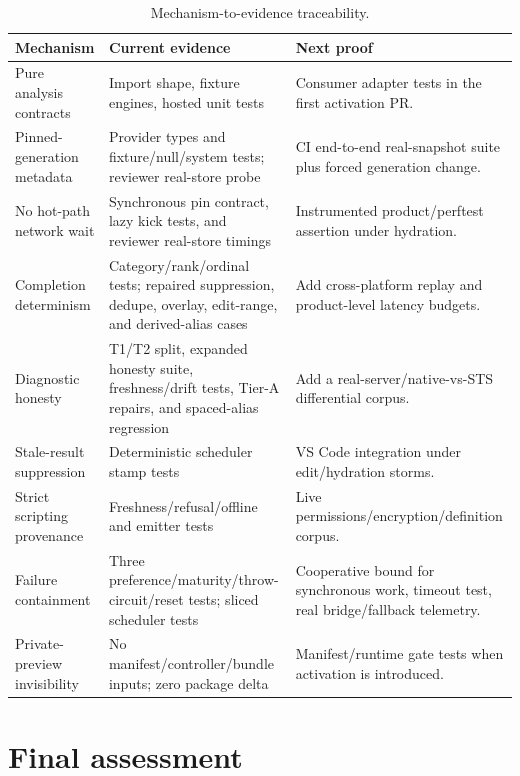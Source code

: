 \documentclass[11pt]{article}
\begin{document}
\begin{table}[H]
\centering
\small
\caption{Mechanism-to-evidence traceability.}
\label{tab:trace}
\begin{tabularx}{\textwidth}{@{}p{}p{}X@{}}
\toprule
\textbf{Mechanism} & \textbf{Current evidence} & \textbf{Next proof}\\
\midrule
Pure analysis contracts & Import shape, fixture engines, hosted unit tests & Consumer adapter tests in the first activation PR.\\
Pinned-generation metadata & Provider types and fixture/null/system tests; reviewer real-store probe & CI end-to-end real-snapshot suite plus forced generation change.\\
No hot-path network wait & Synchronous pin contract, lazy kick tests, and reviewer real-store timings & Instrumented product/perftest assertion under hydration.\\
Completion determinism & Category/rank/ordinal tests; repaired suppression, dedupe, overlay, edit-range, and derived-alias cases & Add cross-platform replay and product-level latency budgets.\\
Diagnostic honesty & T1/T2 split, expanded honesty suite, freshness/drift tests, Tier-A repairs, and spaced-alias regression & Add a real-server/native-vs-STS differential corpus.\\
Stale-result suppression & Deterministic scheduler stamp tests & VS Code integration under edit/hydration storms.\\
Strict scripting provenance & Freshness/refusal/offline and emitter tests & Live permissions/encryption/definition corpus.\\
Failure containment & Three preference/maturity/throw-circuit/reset tests; sliced scheduler tests & Cooperative bound for synchronous work, timeout test, real bridge/fallback telemetry.\\
Private-preview invisibility & No manifest/controller/bundle inputs; zero package delta & Manifest/runtime gate tests when activation is introduced.\\
\bottomrule
\end{tabularx}
\end{table}

\section{Final assessment}
\end{document}
